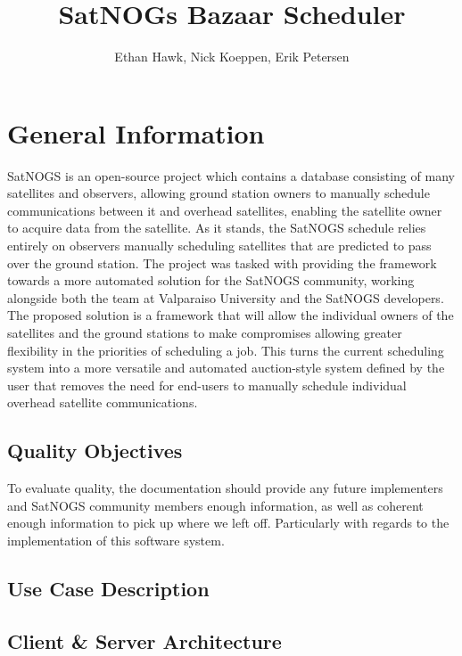 \documentclass{article}
\author{Ethan Hawk, Nick Koeppen, Erik Petersen}
\title{SatNOGs Bazaar Scheduler}
\begin{document}
\maketitle
\tableofcontents

\section{General Information}

SatNOGS is an open-source project which contains a database consisting of many
satellites and observers, allowing ground station owners to manually schedule
communications between it and overhead satellites, enabling the satellite owner
to acquire data from the satellite. As it stands, the SatNOGS schedule relies
entirely on observers manually scheduling satellites that are predicted to pass
over the ground station. The project was tasked with providing the framework
towards a more automated solution for the SatNOGS community, working alongside
both the team at Valparaiso University and the SatNOGS developers. The proposed
solution is a framework that will allow the individual owners of the satellites
and the ground stations to make compromises allowing greater flexibility in the
priorities of scheduling a job. This turns the current scheduling system into a
more versatile and automated auction-style system defined by the user that
removes the need for end-users to manually schedule individual overhead
satellite communications.

\subsection{Quality Objectives}

To evaluate quality, the documentation should provide any future implementers
and SatNOGS community members enough information, as well as coherent enough
information to pick up where we left off. Particularly with regards to the
implementation of this software system.

\subsection{Use Case Description}


\subsection{Client \& Server Architecture}
\end{document}
